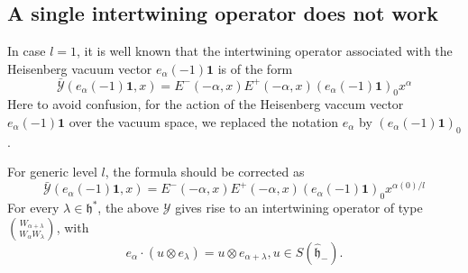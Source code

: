 \documentclass{article}
\theoremstyle{definition}
\newcommand{\h}{{\mathfrak h}}
\newcommand{\Y}{{\mathcal Y}}
\newcommand{\one}{\mathbf{1}}
\begin{document}
\subsection{A single intertwining operator does not work}
In case $l=1$, it is well known that the intertwining operator associated with the Heisenberg vacuum vector $e_\alpha(-1)\one$ is of the form 
$$\bar{\Y}(e_\alpha(-1)\one, x) = E^-(-\alpha, x)E^+(-\alpha, x) (e_\alpha(-1)\one)_0 x^{\alpha}$$
Here to avoid confusion, for the action of the Heisenberg vaccum vector $e_\alpha(-1)\one$ over the vacuum space, we replaced the notation $e_\alpha$ by $(e_\alpha(-1)\one)_0$. 

For generic level $l$, the formula should be corrected as
$$\bar{\Y}(e_\alpha(-1)\one, x) = E^-(-\alpha, x)E^+(-\alpha, x) (e_\alpha(-1)\one)_0 x^{\alpha(0)/l}$$
For every $\lambda\in \h^*$, the above $\Y$ gives rise to an intertwining operator of type $\binom{W_{\alpha+\lambda}}{W_\alpha W_\lambda}$, with  
$$e_\alpha \cdot (u\otimes e_\lambda) = u\otimes e_{\alpha+\lambda}, u\in S(\hat\h_-).$$
\end{document}

